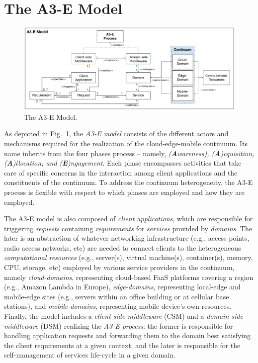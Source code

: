 \section{The A3-E Model}\label{sec:proposal}

\begin{figure}[tbp]
	\includegraphics[width=1\textwidth]{figs/A3-E-model.pdf}
	\caption{The A3-E Model.}
	\label{fig:A3-E-model}
\end{figure}

As depicted in Fig.~\ref{fig:A3-E-model}, the \textit{A3-E model} consists of the different actors and mechanisms required for the realization of the cloud-edge-mobile continuum. Its name inherits from the four phases process -- namely, \textit{(\textbf{A}wareness), (\textbf{A})cquisition, (\textbf{A})llocation, and (\textbf{E})ngagement}. Each phase encompasses activities that take care of specific concerns in the interaction among client applications and the constituents of the continuum. To address the continuum heterogeneity, the A3-E process is flexible with respect to which phases are employed and how they are employed.

The A3-E model is also composed of \textit{client applications}, which are responsible for triggering \textit{requests} containing \textit{requirements} for  \textit{services} provided by \textit{domains}. The later is an abstraction of whatever networking infrastructure (e.g., access points, radio access networks, etc) are needed to connect clients to the heterogeneous \textit{computational resources} (e.g., server(s), virtual machine(s), container(s), memory, CPU, storage, etc) employed by various service providers in the continuum, namely \textit{cloud-domains}, representing cloud-based FaaS platforms covering a region (e.g., Amazon Lambda in Europe), \textit{edge-domains}, representing local-edge and mobile-edge sites (e.g., servers within an office building or at cellular base stations), and \textit{mobile-domains}, representing mobile device's own resources.
Finally, the model includes a \textit{client-side middleware} (CSM) and a \textit{domain-side middleware} (DSM) realizing the \textit{A3-E process}: the former is responsible for handling application requests and forwarding them to the domain best satisfying the client requirements at a given context; and the later is responsible for the self-management of services life-cycle in a given domain. 

